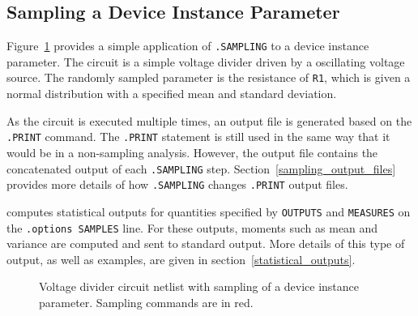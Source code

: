 
\subsection{Sampling a Device Instance Parameter}
\label{sampling_InstanceParam}
Figure~\ref{Sampling_Netlist_1} provides a simple application of \verb|.SAMPLING| 
to a device instance parameter.  The circuit is a simple voltage divider driven 
by a oscillating voltage source.  The randomly sampled parameter is the resistance 
of \texttt{R1}, which is given a normal distribution with a specified mean and 
standard deviation.

As the circuit is executed multiple times, an output file is generated based on 
the \verb|.PRINT| command.  The \verb|.PRINT| statement is still used in the same 
way that it would be in a non-sampling analysis.  However, the output file 
contains the concatenated output of each \verb|.SAMPLING| step.  
Section~\ref{sampling_output_files} provides more details of how \texttt{.SAMPLING} 
changes \texttt{.PRINT} output files.

\Xyce{} computes statistical outputs for quantities specified by \texttt{OUTPUTS} 
and \texttt{MEASURES} on the \texttt{.options SAMPLES} line.  For these outputs,
moments such as mean and variance are computed and sent to standard output.  More 
details of this type of output, as well as examples, are given in section~\ref{statistical_outputs}.
\begin{figure}[htbp]
\begin{centering}
\caption{Voltage divider circuit netlist with sampling of a device instance parameter.
Sampling commands are in \color{XyceRed}red\color{black}.
\label{Sampling_Netlist_1}}
\end{centering}
\end{figure}

